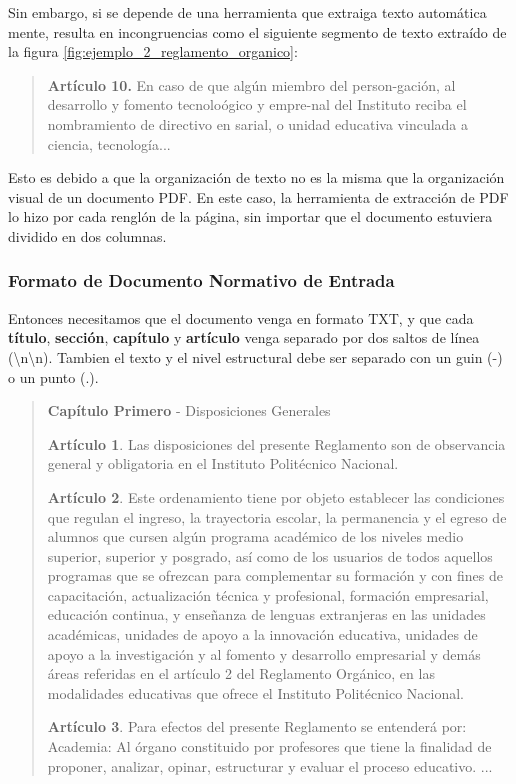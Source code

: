Sin embargo, si se depende de una herramienta que extraiga texto automática mente, resulta en incongruencias como el siguiente segmento de texto extraído de la figura \ref{fig:ejemplo_2_reglamento_organico}:

\begin{quote}
    \textbf{Artículo 10.} En caso de que algún miembro del person-gación, al desarrollo y fomento tecnoloógico y empre-nal del Instituto reciba el nombramiento de directivo en sarial, o unidad educativa vinculada a ciencia, tecnología...
\end{quote}

Esto es debido a que la organización de texto no es la misma que la organización visual de un documento PDF. En este caso, la herramienta de extracción de PDF lo hizo por cada renglón de la página, sin importar que el documento estuviera dividido en dos columnas.

\newpage
\subsubsection{Formato de Documento Normativo de Entrada}

Entonces necesitamos que el documento venga en formato TXT, y que cada \textbf{título}, \textbf{sección}, \textbf{capítulo} y \textbf{artículo} venga separado por dos saltos de línea (\textbackslash n\textbackslash n). Tambien el texto y el nivel estructural debe ser separado con un guin (-) o un punto (.).

\begin{quote}
    \textbf{Capítulo Primero} - Disposiciones Generales
    
    \textbf{Artículo 1}. Las disposiciones del presente Reglamento son de observancia general y obligatoria en el Instituto Politécnico Nacional.
    
    \textbf{Artículo 2}. Este ordenamiento tiene por objeto establecer las condiciones que regulan el ingreso, la trayectoria escolar, la permanencia y el egreso de alumnos que cursen algún programa académico de los niveles medio superior, superior y posgrado, así como de los usuarios de todos aquellos programas que se ofrezcan para complementar su formación y con fines de capacitación, actualización técnica y profesional, formación empresarial, educación continua, y enseñanza de lenguas extranjeras en las unidades académicas, unidades de apoyo a la innovación educativa, unidades de apoyo a la investigación y al fomento y desarrollo empresarial y demás áreas referidas en el artículo 2 del Reglamento Orgánico, en las modalidades educativas que ofrece el Instituto Politécnico Nacional.
    
    \textbf{Artículo 3}. Para efectos del presente Reglamento se entenderá por:
    Academia: Al órgano constituido por profesores que tiene la finalidad de proponer, analizar, opinar, estructurar y evaluar el proceso educativo.
    ...
\end{quote}

